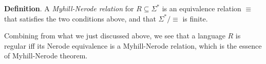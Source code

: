 \documentclass[12pt]{article}
\begin{document}
\textbf{Definition}.  A \emph{Myhill-Nerode relation} for $R\subseteq \Sigma^*$ is an equivalence relation $\equiv$ that satisfies the two conditions above, and that $\Sigma^*/\equiv$ is finite.

Combining from what we just discussed above, we see that a language $R$ is regular iff its Nerode equivalence is a Myhill-Nerode relation, which is the essence of Myhill-Nerode theorem.
\end{document}
